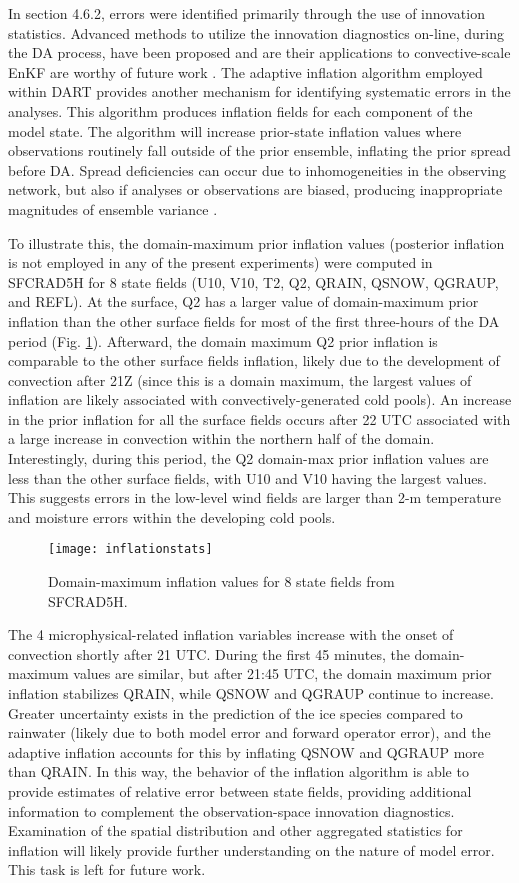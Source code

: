 In section 4.6.2, errors were identified primarily through the use of innovation statistics. Advanced methods to utilize the innovation diagnostics on-line, during the DA process, have been proposed and are their applications to convective-scale EnKF are worthy of future work \citep{deedasilva98}. The adaptive inflation algorithm employed within DART provides another mechanism for identifying systematic errors in the analyses. This algorithm produces inflation fields for each component of the model state. The algorithm will increase prior-state inflation values where observations routinely fall outside of the prior ensemble, inflating the prior spread before DA. Spread deficiencies can occur due to inhomogeneities in the observing network, but also if analyses or observations are biased, producing inappropriate magnitudes of ensemble variance \citep{anderson09}.

To illustrate this, the domain-maximum prior inflation values (posterior inflation is not employed in any of the present experiments) were computed in SFCRAD5H for 8 state fields (U10, V10, T2, Q2, QRAIN, QSNOW, QGRAUP, and REFL). At the surface, Q2 has a larger value of domain-maximum prior inflation than the other surface fields for most of the first three-hours of the DA period (Fig. \ref{infstats}). Afterward, the domain maximum Q2 prior inflation is comparable to the other surface fields inflation, likely due to the development of convection after 21Z (since this is a domain maximum, the largest values of inflation are likely associated with convectively-generated cold pools). An increase in the prior inflation for all the surface fields occurs after 22 UTC associated with a large increase in convection within the northern half of the domain. Interestingly, during this period, the Q2 domain-max prior inflation values are less than the other surface fields, with U10 and V10 having the largest values. This suggests errors in the low-level wind fields are larger than 2-m temperature and moisture errors within the developing cold pools.

\begin{figure}
\centering
\texttt{[image: inflationstats]}
\caption{Domain-maximum inflation values for 8 state fields from SFCRAD5H.}
\label{infstats}
\end{figure}

The 4 microphysical-related inflation variables increase with the onset of convection shortly after 21 UTC. During the first 45 minutes, the domain-maximum values are similar, but after 21:45 UTC, the domain maximum prior inflation stabilizes QRAIN, while QSNOW and QGRAUP continue to increase. Greater uncertainty exists in the prediction of the ice species compared to rainwater (likely due to both model error and forward operator error), and the adaptive inflation accounts for this by inflating QSNOW and QGRAUP more than QRAIN. In this way, the behavior of the inflation algorithm is able to provide estimates of relative error between state fields, providing additional information to complement the observation-space innovation diagnostics. Examination of the spatial distribution and other aggregated statistics for inflation will likely provide further understanding on the nature of model error. This task is left for future work.


